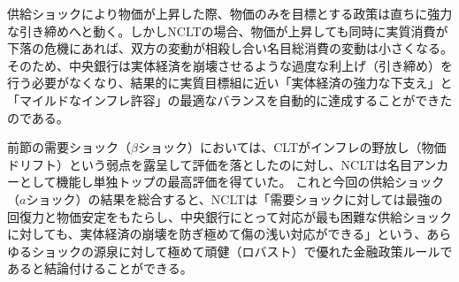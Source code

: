 供給ショックにより物価が上昇した際、物価のみを目標とする政策は直ちに強力な引き締めへと動く。しかしNCLTの場合、物価が上昇しても同時に実質消費が下落の危機にあれば、双方の変動が相殺し合い名目総消費の変動は小さくなる。そのため、中央銀行は実体経済を崩壊させるような過度な利上げ（引き締め）を行う必要がなくなり、結果的に実質目標組に近い「実体経済の強力な下支え」と「マイルドなインフレ許容」の最適なバランスを自動的に達成することができたのである。

前節の需要ショック（\(\beta\)ショック）においては、CLTがインフレの野放し（物価ドリフト）という弱点を露呈して評価を落としたのに対し、NCLTは名目アンカーとして機能し単独トップの最高評価を得ていた。
これと今回の供給ショック（\(a\)ショック）の結果を総合すると、NCLTは「需要ショックに対しては最強の回復力と物価安定をもたらし、中央銀行にとって対応が最も困難な供給ショックに対しても、実体経済の崩壊を防ぎ極めて傷の浅い対応ができる」という、あらゆるショックの源泉に対して極めて頑健（ロバスト）で優れた金融政策ルールであると結論付けることができる。